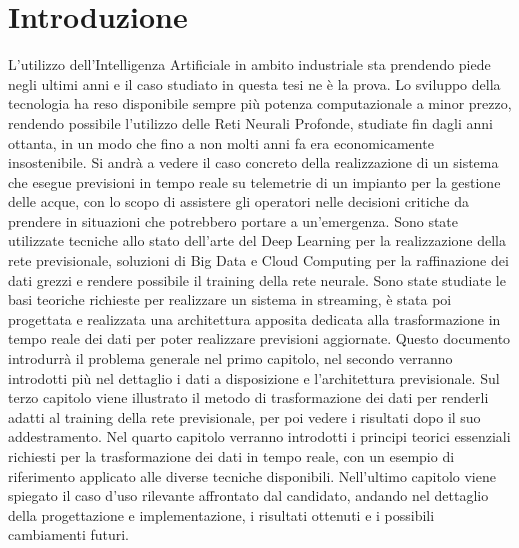 \chapter*{Introduzione} 
L'utilizzo dell'Intelligenza Artificiale in ambito industriale sta prendendo piede negli ultimi anni e il caso studiato in questa tesi ne è la prova. Lo sviluppo della tecnologia ha reso disponibile sempre più potenza computazionale a minor prezzo, rendendo possibile l'utilizzo delle Reti Neurali Profonde, studiate fin dagli anni ottanta, in un modo che fino a non molti anni fa era economicamente insostenibile. Si andrà a vedere il caso concreto della realizzazione di un sistema che esegue previsioni in tempo reale su telemetrie di un impianto per la gestione delle acque, con lo scopo di assistere gli operatori nelle decisioni critiche da prendere in situazioni che potrebbero portare a un'emergenza. Sono state utilizzate tecniche allo stato dell'arte del Deep Learning per la realizzazione della rete previsionale, soluzioni di Big Data e Cloud Computing per la raffinazione dei dati grezzi e rendere possibile il training della rete neurale. Sono state studiate le basi teoriche richieste per realizzare un sistema in streaming, è stata poi progettata e realizzata una architettura apposita dedicata alla trasformazione in tempo reale dei dati per poter realizzare previsioni aggiornate.  \newline Questo documento introdurrà il problema generale nel primo capitolo, nel secondo verranno introdotti più nel dettaglio i dati a disposizione e l'architettura previsionale. Sul terzo capitolo viene illustrato il metodo di trasformazione dei dati per renderli adatti al training della rete previsionale, per poi vedere i risultati dopo il suo addestramento. Nel quarto capitolo verranno introdotti i principi teorici essenziali richiesti per la trasformazione dei dati in tempo reale, con un esempio di riferimento applicato alle diverse tecniche disponibili. Nell'ultimo capitolo viene spiegato il caso d'uso rilevante affrontato dal candidato, andando nel dettaglio della progettazione e implementazione, i risultati ottenuti e i possibili cambiamenti futuri.